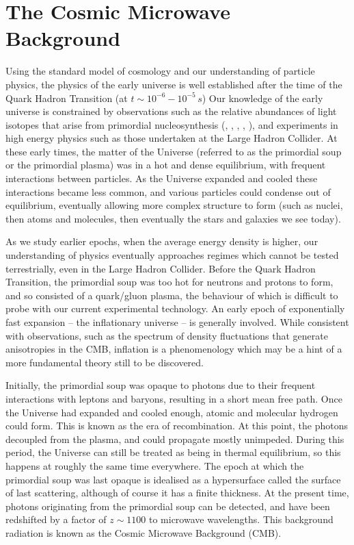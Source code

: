 \documentclass[a4paper,12pt]{report}
\begin{document}
\section{The Cosmic Microwave Background}
Using the standard model of cosmology and our understanding of particle physics, the physics of the early universe is well established after the time of the Quark Hadron Transition (at $t \sim 10^{-6} - 10^{-5}\, \si{s}$) Our knowledge of the early universe is constrained by observations such as the relative abundances of light isotopes that arise from primordial nucleosynthesis (, , , , ), and experiments in high energy physics such as those undertaken at the Large Hadron Collider. At these early times, the matter of the Universe (referred to as the primordial soup or the primordial plasma) was in a hot and dense equilibrium, with frequent interactions between particles. As the Universe expanded and cooled these interactions became less common, and various particles could condense out of equilibrium, eventually allowing more complex structure to form (such as nuclei, then atoms and molecules, then eventually the stars and galaxies we see today).

As we study earlier epochs, when the average energy density is higher, our understanding of physics eventually approaches regimes which cannot be tested terrestrially, even in the Large Hadron Collider. Before the Quark Hadron Transition, the primordial soup was too hot for neutrons and protons to form, and so consisted of a quark/gluon plasma, the behaviour of which is difficult to probe with our current experimental technology. An early epoch of exponentially fast expansion -- the inflationary universe -- is generally involved. While consistent with observations, such as the spectrum of density fluctuations that generate anisotropies in the CMB, inflation is a phenomenology which may be a hint of a more fundamental theory still to be discovered.

Initially, the primordial soup was opaque to photons due to their frequent interactions with leptons and baryons, resulting in a short mean free path. Once the Universe had expanded and cooled enough, atomic and molecular hydrogen could form. This is known as the era of recombination. At this point, the photons decoupled from the plasma, and could propagate mostly unimpeded. During this period, the Universe can still be treated as being in thermal equilibrium, so this happens at roughly the same time everywhere. The epoch at which the primordial soup was last opaque is idealised as a hypersurface called the surface of last scattering, although of course it has a finite thickness. At the present time, photons originating from the primordial soup can be detected, and have been redshifted by a factor of $z \sim 1100$ to microwave wavelengths. This background radiation is known as the Cosmic Microwave Background (CMB).
\end{document}

